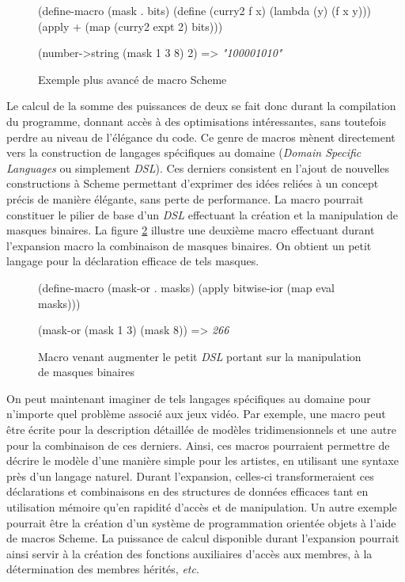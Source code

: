 \documentclass[12pt,twoside,letterpaper,francais]{book}
\newcommand{\scheme}[1]{\selectlanguage{english}{\tt #1}\selectlanguage{french}}
\newcommand{\schemeresult}[1]{{\it #1}}
\begin{document}
\begin{figure}[htb!]
  \begin{schemecode}
(define-macro (mask . bits)
  (define (curry2 f x) (lambda (y) (f x y)))
  (apply + (map (curry2 expt 2) bits)))

(number->string (mask 1 3 8) 2) => \schemeresult{"100001010"}
  \end{schemecode}
  \caption{Exemple plus avancé de macro Scheme}
  \label{Scheme:macro-ex1}
\end{figure}

Le calcul de la somme des puissances de deux se fait donc durant la
compilation du programme, donnant accès à des optimisations
intéressantes, sans toutefois perdre au niveau de l'élégance du
code. Ce genre de macros mènent directement vers la construction de
langages spécifiques au domaine (\textit{Domain Specific Languages} ou
simplement \textit{DSL}). Ces derniers consistent en l'ajout de
nouvelles constructions à Scheme permettant d'exprimer des idées
reliées à un concept précis de manière élégante, sans perte de
performance. La macro \scheme{mask} pourrait constituer le pilier de
base d'un \textit{DSL} effectuant la création et la manipulation de
masques binaires. La figure \ref{Scheme:macro-mini-dsl} illustre une
deuxième macro effectuant durant l'expansion macro la combinaison de
masques binaires. On obtient un petit langage pour la déclaration
efficace de tels masques.\\

\begin{figure}[htb!]
  \begin{schemecode}
(define-macro (mask-or . masks)
  (apply bitwise-ior (map eval masks)))

(mask-or (mask 1 3) (mask 8)) => \schemeresult{266}
  \end{schemecode}
  \caption{Macro venant augmenter le petit \textit{DSL} portant sur la
    manipulation de masques binaires}
  \label{Scheme:macro-mini-dsl}
\end{figure}

On peut maintenant imaginer de tels langages spécifiques au domaine
pour n'importe quel problème associé aux jeux vidéo. Par exemple, une
macro peut être écrite pour la description détaillée de modèles
tridimensionnels et une autre pour la combinaison de ces
derniers. Ainsi, ces macros pourraient permettre de décrire le modèle
d'une manière simple pour les artistes, en utilisant une syntaxe près
d'un langage naturel. Durant l'expansion, celles-ci transformeraient
ces déclarations et combinaisons en des structures de données
efficaces tant en utilisation mémoire qu'en rapidité d'accès et de
manipulation. Un autre exemple pourrait être la création d'un système
de programmation orientée objets à l'aide de macros Scheme. La
puissance de calcul disponible durant l'expansion pourrait ainsi
servir à la création des fonctions auxiliaires d'accès aux membres, à
la détermination des membres hérités, \textit{etc}.
\end{document}
